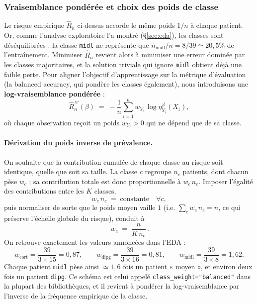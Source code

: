 \documentclass[a4paper,11pt]{paper}
\theoremstyle{plain}
\theoremstyle{definition}
\theoremstyle{remark}
\begin{document}
\subsubsection{Vraisemblance pondérée et choix des poids de classe}
\label{sec:weights}

Le risque empirique $\hat R_n$ ci-dessus accorde le même poids $1/n$ à chaque patient. Or, comme l'analyse exploratoire l'a montré (§\ref{sec:eda}), les classes sont déséquilibrées : la classe \texttt{midl} ne représente que $n_{\text{midl}}/n = 8/39 \simeq 20{,}5\%$ de l'entraînement. Minimiser $\hat R_n$ revient alors à minimiser une erreur dominée par les classes majoritaires, et la solution triviale qui ignore \texttt{midl} obtient déjà une faible perte. Pour aligner l'objectif d'apprentissage sur la métrique d'évaluation (la balanced accuracy, qui pondère les classes également), nous introduisons une \textbf{log-vraisemblance pondérée} :
$$
    \hat{R}_n^{\,w}(\beta) \;=\; -\frac{1}{n} \sum_{i=1}^n w_{Y_i}\,\log \eta_{Y_i}^\beta(X_i),
$$
où chaque observation reçoit un poids $w_{Y_i} > 0$ qui ne dépend que de sa classe.

\paragraph{Dérivation du poids inverse de prévalence.}
On souhaite que la contribution cumulée de chaque classe au risque soit identique, quelle que soit sa taille. La classe $c$ regroupe $n_c$ patients, dont chacun pèse $w_c$ ; sa contribution totale est donc proportionnelle à $w_c\, n_c$. Imposer l'égalité des contributions entre les $K$ classes,
$$
    w_c\, n_c \;=\; \text{constante} \quad \forall c,
$$
puis normaliser de sorte que le poids moyen vaille $1$ (i.e. $\sum_c w_c\, n_c = n$, ce qui préserve l'échelle globale du risque), conduit à
$$
    \boxed{\,w_c \;=\; \frac{n}{K\, n_c}\,}.
$$
On retrouve exactement les valeurs annoncées dans l'EDA :
$$
    w_{\text{cort}} = \frac{39}{3 \times 15} = 0{,}87,\qquad
    w_{\text{dipg}} = \frac{39}{3 \times 16} = 0{,}81,\qquad
    w_{\text{midl}} = \frac{39}{3 \times 8} = 1{,}62.
$$
Chaque patient \texttt{midl} pèse ainsi $\simeq 1{,}6$ fois un patient « moyen », et environ deux fois un patient \texttt{dipg}. Ce schéma est celui appelé \texttt{class\_weight="balanced"} dans la plupart des bibliothèques, et il revient à pondérer la log-vraisemblance par l'inverse de la fréquence empirique de la classe.
\end{document}
